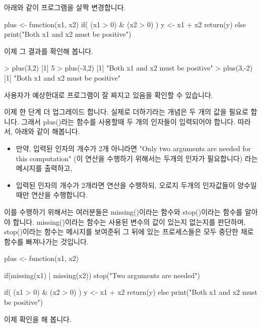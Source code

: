 아래와 같이 프로그램을 살짝 변경합니다. 

\begin{Schunk}
\begin{Soutput}
plus <- function(x1, x2){
	if( (x1 > 0) & (x2 > 0) ){
		y <- x1 + x2
		return(y)
	}
	else print("Both x1 and x2 must be positive")
}
\end{Soutput}
\end{Schunk}

이제 그 결과를 확인해 봅니다. 

\begin{Schunk}
\begin{Soutput}
> plus(3,2)
[1] 5
> plus(-3,2)
[1] "Both x1 and x2 must be positive"
> plus(3,-2)
[1] "Both x1 and x2 must be positive"
\end{Soutput}
\end{Schunk}

사용자가 예상한대로 프로그램이 잘 짜지고 있음을 확인할 수 있습니다. 

이제 한 단계 더 업그레이드 합니다. 
실제로 더하기라는 개념은 두 개의 값을 필요로 합니다. 
그래서 plus()라는 함수를 사용할때 두 개의 인자들이 입력되어야 합니다.
따라서, 아래와 같이 해봅니다.

\begin{itemize}
\item 만약, 입력된 인자의 개수가 2개 아니라면 "Only two arguments are needed for this computation" (이 연산을 수행하기 위해서는 두개의 인자가 필요합니다) 라는 메시지를 출력하고, 
\item 입력된 인자의 개수가 2개라면 연산을 수행하되, 오로지 두개의 인자값들이 양수일때만 연산을 수행합니다. 
\end{itemize}

이를 수행하기 위해서는 여러분들은 missing()이라는 함수와 stop()이라는 함수를 알아야 합니다. 
missing()이라는 함수는 사용된 변수의 값이 있는지 없는지를 판단하며, stop()이라는 함수는 메시지를 보여준뒤 그 뒤에 있는 프로세스들은 모두 중단한 채로 함수를 빠져나가는 것입니다. 

\begin{Schunk}
\begin{Soutput}
plus <- function(x1, x2){
	if(missing(x1) | missing(x2)) stop("Two arguments are needed")
	
	if( (x1 > 0) & (x2 > 0) ){
		y <- x1 + x2
		return(y)
	}
	else print("Both x1 and x2 must be positive")
}
\end{Soutput}
\end{Schunk}

이제 확인을 해 봅니다. 

